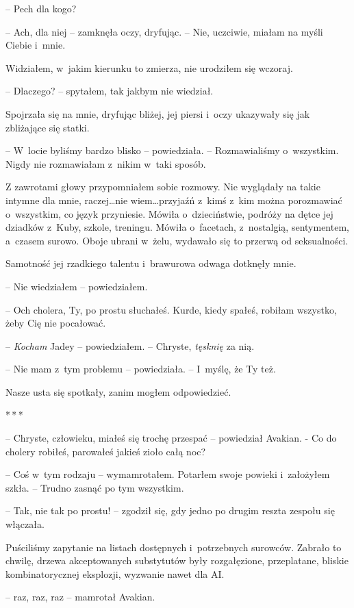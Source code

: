 \documentclass[oneside,polish,12pt,sfheadings]{mwbk}
\newcommand{\threeast}{\bigskip\par\centerline{*\,*\,*}\medskip\par}%
\begin{document}
-- Pech dla kogo?

-- Ach, dla niej -- zamknęła oczy, dryfując. -- Nie, uczciwie, miałam na
myśli Ciebie i~mnie.

Widziałem, w~jakim kierunku to zmierza, nie urodziłem się wczoraj.

-- Dlaczego? -- spytałem, tak jakbym nie wiedział.

Spojrzała się na mnie, dryfując bliżej, jej piersi i~oczy ukazywały się
jak zbliżające się statki.

-- W~locie byliśmy bardzo blisko -- powiedziała. -- Rozmawialiśmy o~wszystkim. Nigdy nie rozmawiałam z~nikim w~taki sposób.

Z zawrotami głowy przypomniałem sobie rozmowy. Nie wyglądały na takie
intymne dla mnie, raczej\ldots nie wiem\ldots przyjaźń z~kimś z~kim można
porozmawiać o~wszystkim, co język przyniesie. Mówiła o~dzieciństwie,
podróży na dętce jej dziadków z~Kuby, szkole, treningu. Mówiła o~facetach, z~nostalgią, sentymentem, a~czasem surowo. Oboje ubrani w~żelu, wydawało się to przerwą od seksualności.

Samotność jej rzadkiego talentu i~brawurowa odwaga dotknęły mnie.

-- Nie wiedziałem -- powiedziałem.

-- Och cholera, Ty, po prostu słuchałeś. Kurde, kiedy spałeś, robiłam
wszystko, żeby Cię nie pocałować.

-- \emph{Kocham} Jadey -- powiedziałem. -- Chryste, \emph{tęsknię} za nią.

-- Nie mam z~tym problemu -- powiedziała. -- I~myślę, że Ty też.

Nasze usta się spotkały, zanim mogłem odpowiedzieć.

\threeast

-- Chryste, człowieku, miałeś się trochę przespać -- powiedział Avakian. -
Co do cholery robiłeś, parowałeś jakieś zioło całą noc?

-- Coś w~tym rodzaju -- wymamrotałem. Potarłem swoje powieki i~założyłem
szkła. -- Trudno zasnąć po tym wszystkim.

-- Tak, nie tak po prostu! -- zgodził się, gdy jedno po drugim reszta
zespołu się włączała.

Puściliśmy zapytanie na listach dostępnych i~potrzebnych surowców.
Zabrało to chwilę, drzewa akceptowanych substytutów były rozgałęzione,
przeplatane, bliskie kombinatorycznej eksplozji, wyzwanie nawet dla AI.

-- raz, raz, raz -- mamrotał Avakian.
\end{document}
